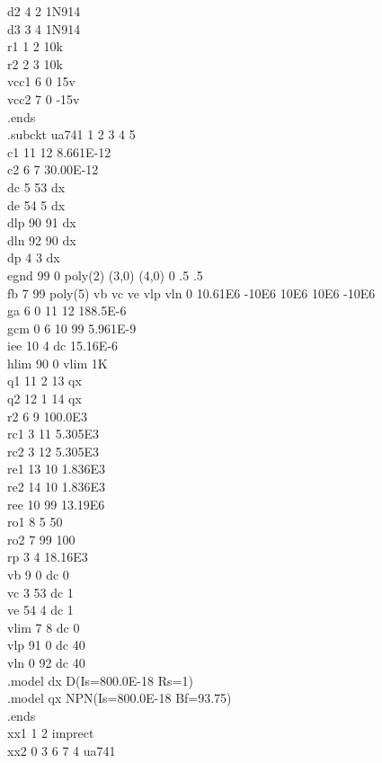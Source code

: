 \documentclass[12pt]{article}
\begin{document}
d2 4 2 1N914\\
d3 3 4 1N914\\
r1 1 2 10k\\
r2 2 3 10k\\
vcc1 6 0 15v\\
vcc2 7 0 -15v\\
.ends\\
\newpage
.subckt ua741    1  2  3  4  5\\
c1   11 12 8.661E-12\\
c2    6  7 30.00E-12\\
dc    5 53 dx\\
de   54  5 dx\\
dlp  90 91 dx\\
dln  92 90 dx\\
dp    4  3 dx\\
egnd 99  0 poly(2) (3,0) (4,0) 0 .5 .5\\
fb    7 99 poly(5) vb vc ve vlp vln 0 10.61E6 -10E6 10E6 10E6 -10E6\\
ga    6  0 11 12 188.5E-6\\
gcm   0  6 10 99 5.961E-9\\
iee  10  4 dc 15.16E-6\\
hlim 90  0 vlim 1K\\
q1   11  2 13 qx\\
q2   12  1 14 qx\\
r2    6  9 100.0E3\\
rc1   3 11 5.305E3\\
rc2   3 12 5.305E3\\
re1  13 10 1.836E3\\
re2  14 10 1.836E3\\
ree  10 99 13.19E6\\
\newpage
ro1   8  5 50\\
ro2   7 99 100\\
rp    3  4 18.16E3\\
vb    9  0 dc 0\\
vc    3 53 dc 1\\
ve   54  4 dc 1\\
vlim  7  8 dc 0\\
vlp  91  0 dc 40\\
vln   0 92 dc 40\\
.model dx D(Is=800.0E-18 Rs=1)\\
.model qx NPN(Is=800.0E-18 Bf=93.75)\\
.ends\\
xx1 1 2 imprect\\
xx2 0 3 6 7 4 ua741\\
\end{document}
